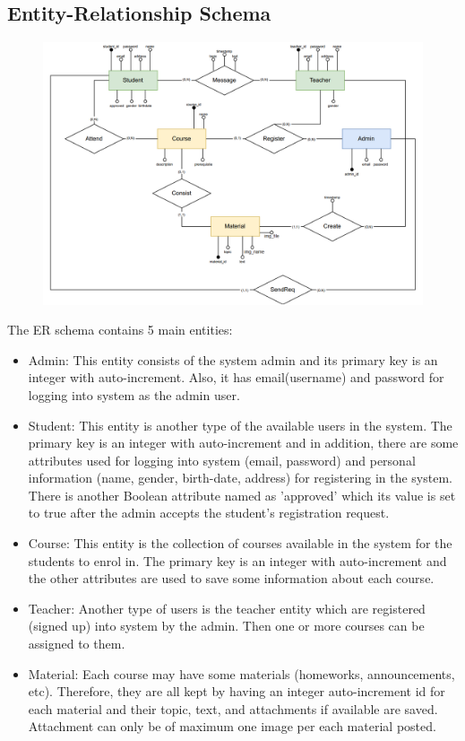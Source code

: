 \subsection{Entity-Relationship Schema}

 \begin{figure}[h!]
   \centering
   \includegraphics[width=17.7cm]{HW_1/images/FINAL-ER.png}
 \end{figure}
 
The ER schema contains 5 main entities:
 \begin{itemize}
  \item Admin: This entity consists of the system admin and its primary key is an integer with auto-increment. Also, it has email(username) and password for logging into system as the admin user.
  \item Student: This entity is another type of the available users in the system. The primary key is an integer with auto-increment and in addition, there are some attributes used for logging into system (email, password) and personal information (name, gender, birth-date, address) for registering in the system. There is another Boolean attribute named as 'approved' which its value is set to true after the admin accepts the student's registration request.
  \item Course: This entity is the collection of courses available in the system for the students to enrol in. The primary key is an integer with auto-increment and the other attributes are used to save some information about each course.
  \item Teacher: Another type of users is the teacher entity which are registered (signed up) into system by the admin. Then one or more courses can be assigned to them.
  \item Material: Each course may have some materials (homeworks, announcements, etc). Therefore, they are all kept by having an integer auto-increment id for each material and their topic, text, and attachments if available are saved. Attachment can only be of maximum one image per each material posted.
 \end{itemize}